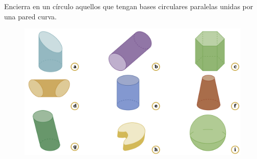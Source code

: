 Encierra en un círculo aquellos que tengan bases circulares paralelas unidas por una pared curva.

\begin{figure}[H]
    \centering
    \includegraphics[width=\linewidth]{../images/20230319103014}
    \caption{}
    \label{fig:20230319103014}
\end{figure}